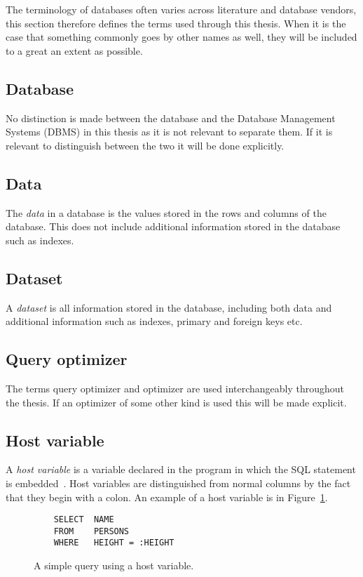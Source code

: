 The terminology of databases often varies across literature and database
vendors, this section therefore defines the terms used through this thesis. When
it is the case that something commonly goes by other names as well, they will be
included to a great an extent as possible.

\subsection*{Database}
No distinction is made between the database and the Database Management Systems
(DBMS) in this thesis as it is not relevant to separate them. If it is relevant
to distinguish between the two it will be done explicitly.

\subsection*{Data}
The \textit{data} in a database is the values stored in the rows and columns of
the database. This does not include additional information stored in the
database such as indexes.

\subsection*{Dataset}
A \textit{dataset} is all information stored in the database, including both
data and additional information such as indexes, primary and foreign keys etc.

\subsection*{Query optimizer}
The terms query optimizer and optimizer are used interchangeably throughout the
thesis. If an optimizer of some other kind is used this will be made explicit.

\subsection*{Host variable}
A \textit{host variable} is a variable declared in the program in which the SQL
statement is embedded~\cite[p. 151]{chamberlin_1998_complete_acgtdud}. Host
variables are distinguished from normal columns by the fact that they begin with
a colon. An example of a host variable is  in
Figure~\ref{fig:sql:hostvar}.

\begin{figure}[ht]
  \begin{verbatim}
    SELECT  NAME
    FROM    PERSONS
    WHERE   HEIGHT = :HEIGHT
  \end{verbatim}
  \caption[A query with a host variable]{A simple query using a host
    variable.}\label{fig:sql:hostvar}
\end{figure}

